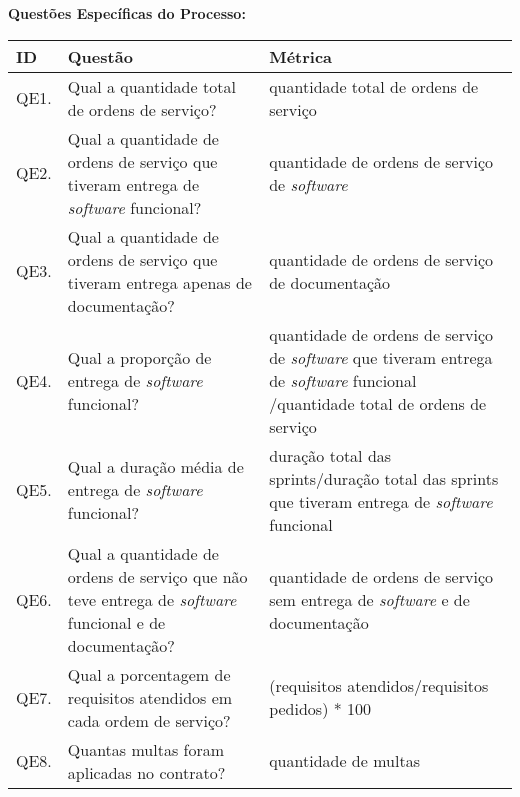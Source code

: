 \textbf{Questões Específicas do Processo:}

\begin{table}[H]
\footnotesize
\center
\begin{tabular}{|p{0.8cm}|p{8.0cm}|p{7.0cm}|}
\hline
\textbf{ID} & \textbf{Questão}                                                                                                                                  & \textbf{Métrica}    \\ \hline
QE1.        & Qual a quantidade total de ordens de serviço?                                                                                                    &  quantidade total de ordens de serviço         \\ \hline
QE2.        & Qual a quantidade de ordens de serviço que tiveram entrega de \textit{software} funcional?                                                                & quantidade de ordens de serviço de \textit{software}          \\ \hline
QE3.        & Qual a quantidade de ordens de serviço que tiveram entrega apenas de documentação?                                                               & quantidade de ordens de serviço de documentação            \\ \hline
QE4.        & Qual a proporção de entrega de \textit{software} funcional?                                                                                               &  quantidade de ordens de serviço de \textit{software} que tiveram entrega de \textit{software} funcional /quantidade total de ordens de serviço                          \\ \hline
QE5.        & Qual a duração média de entrega de \textit{software} funcional?                                                                                           &  duração total das sprints/duração total das sprints que tiveram entrega de \textit{software} funcional                   \\ \hline
QE6.        & Qual a quantidade de ordens de serviço que não teve entrega de \textit{software} funcional e  de documentação?   &  quantidade de ordens de serviço sem entrega de \textit{software} e de documentação        \\ \hline
QE7.        & Qual a porcentagem de requisitos atendidos em cada ordem de serviço?                                                                             &  (requisitos atendidos/requisitos pedidos) * 100 \\ \hline
QE8.        & Quantas multas foram aplicadas no contrato?                                                                                                      &  quantidade de multas                      \\ \hline

\end{tabular}
\end{table}
